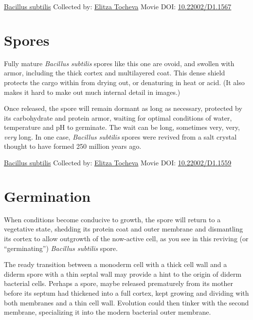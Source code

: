 \documentclass[]{tufte-book}
\begin{document}
\hypertarget{htmlwidget-71d87014e5cbf536cc29}{}

\label{fig:8-6b}\protect\hyperlink{tree}{Bacillus subtilis} Collected by: \protect\hyperlink{elitza_tocheva}{Elitza Tocheva} Movie DOI: \href{https://doi.org/10.22002/D1.1567}{10.22002/D1.1567}

\hypertarget{spores}{%
\section{Spores}\label{spores}}

Fully mature \emph{Bacillus subtilis} spores like this one are ovoid, and swollen with armor, including the thick cortex and multilayered coat. This dense shield protects the cargo within from drying out, or denaturing in heat or acid. (It also makes it hard to make out much internal detail in images.)

Once released, the spore will remain dormant as long as necessary, protected by its carbohydrate and protein armor, waiting for optimal conditions of water, temperature and pH to germinate. The wait can be long, sometimes very, very, \emph{very} long. In one case, \emph{Bacillus subtilis} spores were revived from a salt crystal thought to have formed 250 million years ago.



\hypertarget{htmlwidget-5e65faa434d9528b818a}{}

\label{fig:8-7}\protect\hyperlink{tree}{Bacillus subtilis} Collected by: \protect\hyperlink{elitza_tocheva}{Elitza Tocheva} Movie DOI: \href{https://doi.org/10.22002/D1.1559}{10.22002/D1.1559}

\hypertarget{germination}{%
\section{Germination}\label{germination}}

When conditions become conducive to growth, the spore will return to a vegetative state, shedding its protein coat and outer membrane and dismantling its cortex to allow outgrowth of the now-active cell, as you see in this reviving (or ``germinating'') \emph{Bacillus subtilis} spore.

The ready transition between a monoderm cell with a thick cell wall and a diderm spore with a thin septal wall may provide a hint to the origin of diderm bacterial cells. Perhaps a spore, maybe released prematurely from its mother before its septum had thickened into a full cortex, kept growing and dividing with both membranes and a thin cell wall. Evolution could then tinker with the second membrane, specializing it into the modern bacterial outer membrane.
\end{document}
